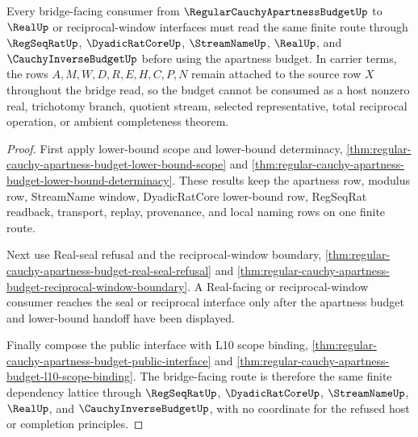 \begin{theorem}
\label{thm:regular-cauchy-apartness-budget-bridge-scope}
Every bridge-facing consumer from $\RegularCauchyApartnessBudgetUp$ to $\RealUp$ or reciprocal-window interfaces must read the same finite route through $\RegSeqRatUp$, $\DyadicRatCoreUp$, $\StreamNameUp$, $\RealUp$, and $\CauchyInverseBudgetUp$ before using the apartness budget. In carrier terms, the rows $A,M,W,D,R,E,H,C,P,N$ remain attached to the source row $X$ throughout the bridge read, so the budget cannot be consumed as a host nonzero real, trichotomy branch, quotient stream, selected representative, total reciprocal operation, or ambient completeness theorem.
\end{theorem}
\begin{proof}
First apply lower-bound scope and lower-bound determinacy, \autoref{thm:regular-cauchy-apartness-budget-lower-bound-scope} and \autoref{thm:regular-cauchy-apartness-budget-lower-bound-determinacy}. These results keep the apartness row, modulus row, StreamName window, DyadicRatCore lower-bound row, RegSeqRat readback, transport, replay, provenance, and local naming rows on one finite route.

Next use Real-seal refusal and the reciprocal-window boundary, \autoref{thm:regular-cauchy-apartness-budget-real-seal-refusal} and \autoref{thm:regular-cauchy-apartness-budget-reciprocal-window-boundary}. A Real-facing or reciprocal-window consumer reaches the seal or reciprocal interface only after the apartness budget and lower-bound handoff have been displayed.

Finally compose the public interface with L10 scope binding, \autoref{thm:regular-cauchy-apartness-budget-public-interface} and \autoref{thm:regular-cauchy-apartness-budget-l10-scope-binding}. The bridge-facing route is therefore the same finite dependency lattice through $\RegSeqRatUp$, $\DyadicRatCoreUp$, $\StreamNameUp$, $\RealUp$, and $\CauchyInverseBudgetUp$, with no coordinate for the refused host or completion principles.
\end{proof}

